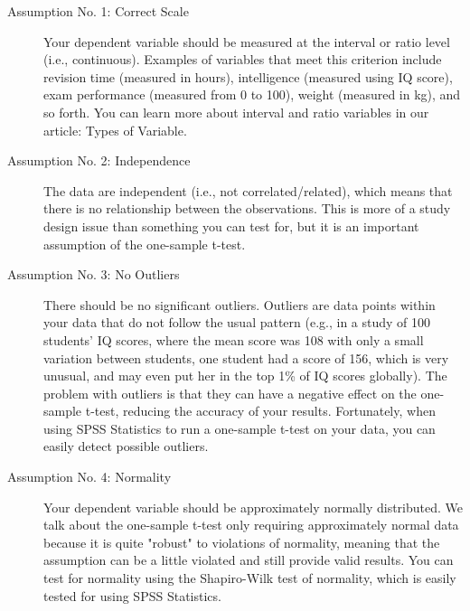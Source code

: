 \documentclass[]{article}
\begin{document}
\begin{description}
	\item[Assumption No. 1: Correct Scale] Your dependent variable should be measured at the interval or ratio level (i.e., continuous). Examples of variables that meet this criterion include revision time (measured in hours), intelligence (measured using IQ score), exam performance (measured from 0 to 100), weight (measured in kg), and so forth. You can learn more about interval and ratio variables in our article: Types of Variable.
	
	\item[Assumption No. 2: Independence] The data are independent (i.e., not correlated/related), which means that there is no relationship between the observations. This is more of a study design issue than something you can test for, but it is an important assumption of the one-sample t-test.
	
	\item[Assumption No. 3: No Outliers] There should be no significant outliers. Outliers are data points within your data that do not follow the usual pattern (e.g., in a study of 100 students' IQ scores, where the mean score was 108 with only a small variation between students, one student had a score of 156, which is very unusual, and may even put her in the top 1\% of IQ scores globally). The problem with outliers is that they can have a negative effect on the one-sample t-test, reducing the accuracy of your results. Fortunately, when using SPSS Statistics to run a one-sample t-test on your data, you can easily detect possible outliers. 
	
	\item[Assumption No. 4: Normality] Your dependent variable should be approximately normally distributed. We talk about the one-sample t-test only requiring approximately normal data because it is quite "robust" to violations of normality, meaning that the assumption can be a little violated and still provide valid results. You can test for normality using the Shapiro-Wilk test of normality, which is easily tested for using SPSS Statistics.
\end{description}
\end{document}
